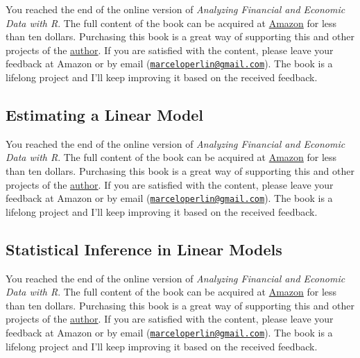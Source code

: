 \documentclass[
  12pt,
]{book}
\newenvironment{pleasebuyit}
{\begin{noteblock}
		
	} {\end{noteblock}}
\begin{document}
\begin{pleasebuyit}
You reached the end of the online version of \emph{Analyzing Financial
and Economic Data with R}. The full content of the book can be acquired
at \href{https://www.amazon.com/dp/B084LSNXMN}{Amazon} for less than ten
dollars. Purchasing this book is a great way of supporting this and
other projects of the \href{https://www.msperlin.com/blog/}{author}. If
you are satisfied with the content, please leave your feedback at Amazon
or by email
(\href{mailto:marceloperlin@gmail.com}{\nolinkurl{marceloperlin@gmail.com}}).
The book is a lifelong project and I'll keep improving it based on the
received feedback.
\end{pleasebuyit}

\hypertarget{estimating-ols}{%
\subsection{Estimating a Linear Model}\label{estimating-ols}}

\begin{pleasebuyit}
You reached the end of the online version of \emph{Analyzing Financial
and Economic Data with R}. The full content of the book can be acquired
at \href{https://www.amazon.com/dp/B084LSNXMN}{Amazon} for less than ten
dollars. Purchasing this book is a great way of supporting this and
other projects of the \href{https://www.msperlin.com/blog/}{author}. If
you are satisfied with the content, please leave your feedback at Amazon
or by email
(\href{mailto:marceloperlin@gmail.com}{\nolinkurl{marceloperlin@gmail.com}}).
The book is a lifelong project and I'll keep improving it based on the
received feedback.
\end{pleasebuyit}

\hypertarget{testing-ols}{%
\subsection{Statistical Inference in Linear Models}\label{testing-ols}}

\begin{pleasebuyit}
You reached the end of the online version of \emph{Analyzing Financial
and Economic Data with R}. The full content of the book can be acquired
at \href{https://www.amazon.com/dp/B084LSNXMN}{Amazon} for less than ten
dollars. Purchasing this book is a great way of supporting this and
other projects of the \href{https://www.msperlin.com/blog/}{author}. If
you are satisfied with the content, please leave your feedback at Amazon
or by email
(\href{mailto:marceloperlin@gmail.com}{\nolinkurl{marceloperlin@gmail.com}}).
The book is a lifelong project and I'll keep improving it based on the
received feedback.
\end{pleasebuyit}
\end{document}
